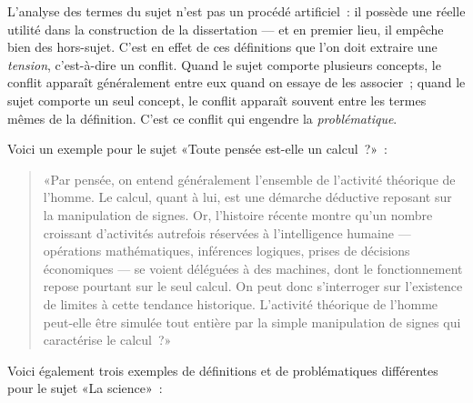 \documentclass[a4paper,11pt]{article}
\newcommand{\cad}{c'est-à-dire}
\begin{document}
L'analyse des termes du sujet n'est pas un procédé artificiel~: il
possède une réelle utilité dans la construction de la dissertation ---
et en premier lieu, il empêche bien des hors-sujet. C'est en effet de
ces définitions que l'on doit extraire une \emph{tension}, \cad{} un
conflit. Quand le sujet comporte plusieurs concepts, le conflit apparaît
généralement entre eux quand on essaye de les associer~; quand le sujet
comporte un seul concept, le conflit apparaît souvent entre les termes
mêmes de la définition. C'est ce conflit qui engendre la
\emph{problématique}.

\par

Voici un exemple pour le sujet «Toute pensée est-elle un calcul~?»~:
\begin{quote}
  «Par pensée, on entend généralement l'ensemble de l'activité théorique
  de l'homme. Le calcul, quant à lui, est une démarche déductive
  reposant sur la manipulation de signes. Or, l'histoire récente montre
  qu'un nombre croissant d'activités autrefois réservées à
  l'intelligence humaine --- opérations mathématiques, inférences
  logiques, prises de décisions économiques --- se voient déléguées à
  des machines, dont le fonctionnement repose pourtant sur le seul
  calcul. On peut donc s'interroger sur l'existence de limites à cette
  tendance historique. L'activité théorique de l'homme peut-elle être
  simulée tout entière par la simple manipulation de signes qui
  caractérise le calcul~?»
\end{quote}

Voici également trois exemples de définitions et de problématiques
différentes pour le sujet «La science»~:
\end{document}
